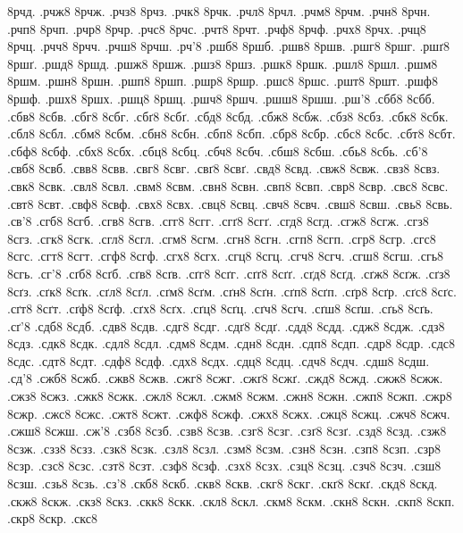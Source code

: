 {8рчд.
.рчж8
8рчж.
.рчз8
8рчз.
.рчк8
8рчк.
.рчл8
8рчл.
.рчм8
8рчм.
.рчн8
8рчн.
.рчп8
8рчп.
.рчр8
8рчр.
.рчс8
8рчс.
.рчт8
8рчт.
.рчф8
8рчф.
.рчх8
8рчх.
.рчц8
8рчц.
.рчч8
8рчч.
.рчш8
8рчш.
.рч'8
.ршб8
8ршб.
.ршв8
8ршв.
.ршг8
8ршг.
.ршґ8
8ршґ.
.ршд8
8ршд.
.ршж8
8ршж.
.ршз8
8ршз.
.ршк8
8ршк.
.ршл8
8ршл.
.ршм8
8ршм.
.ршн8
8ршн.
.ршп8
8ршп.
.ршр8
8ршр.
.ршс8
8ршс.
.ршт8
8ршт.
.ршф8
8ршф.
.ршх8
8ршх.
.ршц8
8ршц.
.ршч8
8ршч.
.ршш8
8ршш.
.рш'8
.сбб8
8сбб.
.сбв8
8сбв.
.сбг8
8сбг.
.сбґ8
8сбґ.
.сбд8
8сбд.
.сбж8
8сбж.
.сбз8
8сбз.
.сбк8
8сбк.
.сбл8
8сбл.
.сбм8
8сбм.
.сбн8
8сбн.
.сбп8
8сбп.
.сбр8
8сбр.
.сбс8
8сбс.
.сбт8
8сбт.
.сбф8
8сбф.
.сбх8
8сбх.
.сбц8
8сбц.
.сбч8
8сбч.
.сбш8
8сбш.
.сбь8
8сбь.
.сб'8
.свб8
8свб.
.свв8
8свв.
.свг8
8свг.
.свґ8
8свґ.
.свд8
8свд.
.свж8
8свж.
.свз8
8свз.
.свк8
8свк.
.свл8
8свл.
.свм8
8свм.
.свн8
8свн.
.свп8
8свп.
.свр8
8свр.
.свс8
8свс.
.свт8
8свт.
.свф8
8свф.
.свх8
8свх.
.свц8
8свц.
.свч8
8свч.
.свш8
8свш.
.свь8
8свь.
.св'8
.сгб8
8сгб.
.сгв8
8сгв.
.сгг8
8сгг.
.сгґ8
8сгґ.
.сгд8
8сгд.
.сгж8
8сгж.
.сгз8
8сгз.
.сгк8
8сгк.
.сгл8
8сгл.
.сгм8
8сгм.
.сгн8
8сгн.
.сгп8
8сгп.
.сгр8
8сгр.
.сгс8
8сгс.
.сгт8
8сгт.
.сгф8
8сгф.
.сгх8
8сгх.
.сгц8
8сгц.
.сгч8
8сгч.
.сгш8
8сгш.
.сгь8
8сгь.
.сг'8
.сґб8
8сґб.
.сґв8
8сґв.
.сґг8
8сґг.
.сґґ8
8сґґ.
.сґд8
8сґд.
.сґж8
8сґж.
.сґз8
8сґз.
.сґк8
8сґк.
.сґл8
8сґл.
.сґм8
8сґм.
.сґн8
8сґн.
.сґп8
8сґп.
.сґр8
8сґр.
.сґс8
8сґс.
.сґт8
8сґт.
.сґф8
8сґф.
.сґх8
8сґх.
.сґц8
8сґц.
.сґч8
8сґч.
.сґш8
8сґш.
.сґь8
8сґь.
.сґ'8
.сдб8
8сдб.
.сдв8
8сдв.
.сдг8
8сдг.
.сдґ8
8сдґ.
.сдд8
8сдд.
.сдж8
8сдж.
.сдз8
8сдз.
.сдк8
8сдк.
.сдл8
8сдл.
.сдм8
8сдм.
.сдн8
8сдн.
.сдп8
8сдп.
.сдр8
8сдр.
.сдс8
8сдс.
.сдт8
8сдт.
.сдф8
8сдф.
.сдх8
8сдх.
.сдц8
8сдц.
.сдч8
8сдч.
.сдш8
8сдш.
.сд'8
.сжб8
8сжб.
.сжв8
8сжв.
.сжг8
8сжг.
.сжґ8
8сжґ.
.сжд8
8сжд.
.сжж8
8сжж.
.сжз8
8сжз.
.сжк8
8сжк.
.сжл8
8сжл.
.сжм8
8сжм.
.сжн8
8сжн.
.сжп8
8сжп.
.сжр8
8сжр.
.сжс8
8сжс.
.сжт8
8сжт.
.сжф8
8сжф.
.сжх8
8сжх.
.сжц8
8сжц.
.сжч8
8сжч.
.сжш8
8сжш.
.сж'8
.сзб8
8сзб.
.сзв8
8сзв.
.сзг8
8сзг.
.сзґ8
8сзґ.
.сзд8
8сзд.
.сзж8
8сзж.
.сзз8
8сзз.
.сзк8
8сзк.
.сзл8
8сзл.
.сзм8
8сзм.
.сзн8
8сзн.
.сзп8
8сзп.
.сзр8
8сзр.
.сзс8
8сзс.
.сзт8
8сзт.
.сзф8
8сзф.
.сзх8
8сзх.
.сзц8
8сзц.
.сзч8
8сзч.
.сзш8
8сзш.
.сзь8
8сзь.
.сз'8
.скб8
8скб.
.скв8
8скв.
.скг8
8скг.
.скґ8
8скґ.
.скд8
8скд.
.скж8
8скж.
.скз8
8скз.
.скк8
8скк.
.скл8
8скл.
.скм8
8скм.
.скн8
8скн.
.скп8
8скп.
.скр8
8скр.
.скс8
}
